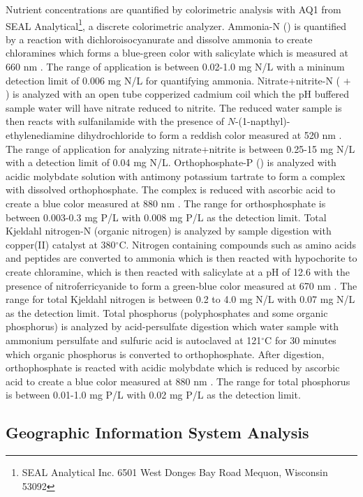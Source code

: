 Nutrient concentrations are quantified by colorimetric analysis with  AQ1 from SEAL Analytical\footnote{SEAL Analytical Inc.
6501 West Donges Bay Road Mequon, Wisconsin 53092}, a discrete colorimetric analyzer.  Ammonia-N () is quantified by a reaction with dichloroisocyanurate and dissolve ammonia to create chloramines which  forms a blue-green color with salicylate which is measured at 660 nm \cite{usepa_method_1993-2}. The range of application is between 0.02-1.0 mg N/L with a mininum detection limit of 0.006 mg N/L for quantifying ammonia.  Nitrate+nitrite-N ( $+$ ) is analyzed with an open tube copperized cadmium coil which the pH buffered sample water will have nitrate reduced to nitrite. The reduced water sample is then reacts with sulfanilamide with the presence of $N$-(1-napthyl)-ethylenediamine dihydrochloride to form a reddish color measured at 520 nm \cite{usepa_method_1993}. The range of application for analyzing nitrate+nitrite is between 0.25-15 mg N/L with a detection limit of 0.04 mg N/L.  Orthophosphate-P () is analyzed with acidic molybdate solution with antimony potassium tartrate to form a complex with dissolved orthophosphate. The complex is reduced with ascorbic acid to create a blue color measured at 880 nm \cite{usepa_method_1993-3}. The range for orthosphosphate is between 0.003-0.3 mg P/L with 0.008 mg P/L as the detection limit. Total Kjeldahl nitrogen-N (organic nitrogen) is analyzed by sample digestion with copper(II) catalyst at 380$^\circ$C. Nitrogen containing compounds such as amino acids and peptides are converted to ammonia which is then reacted with hypochorite to create chloramine, which is then reacted with salicylate at a pH of 12.6 with the presence of nitroferricyanide to form a green-blue color measured at 670 nm \cite{usepa_method_1993-1}. The range for total Kjeldahl nitrogen is between 0.2 to 4.0 mg N/L with 0.07 mg N/L as the detection limit. Total phosphorus (polyphosphates and some organic phosphorus)  is analyzed by acid-persulfate digestion which water sample with ammonium persulfate and sulfuric acid is autoclaved at 121$^\circ$C for 30 minutes which organic phosphorus is converted to orthophosphate. After digestion, orthophosphate is reacted with acidic molybdate which is reduced by ascorbic acid to create a blue color measured at 880 nm \cite{usepa_method_1993-3}. The range for total phosphorus is between 0.01-1.0 mg P/L with 0.02 mg P/L as the detection limit. 



\subsection{Geographic Information System Analysis}

